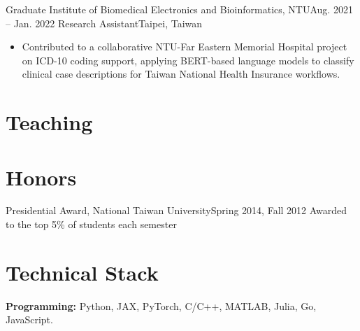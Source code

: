 \documentclass[10pt, letterpaper]{article}
\begin{document}
\entry
{Graduate Institute of Biomedical Electronics and Bioinformatics, NTU}{Aug. 2021 -- Jan. 2022}
{Research Assistant}{Taipei, Taiwan}
\begin{itemize}
  \item Contributed to a collaborative NTU-Far Eastern Memorial Hospital project on ICD-10 coding support, applying BERT-based language models to classify clinical case descriptions for Taiwan National Health Insurance workflows.
\end{itemize}

\section{Teaching}
\par\vspace{2pt}
\par\vspace{2pt}

\section{Honors}
\entry
{Presidential Award, National Taiwan University}{Spring 2014, Fall 2012}
{Awarded to the top 5\% of students each semester}{}

\section{Technical Stack}
\small{
\textbf{Programming:} Python, JAX, PyTorch, C/C++, MATLAB, Julia, Go, JavaScript.
}
\end{document}
